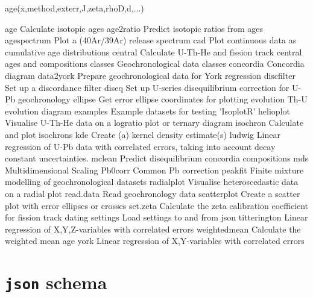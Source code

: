 \begin{refsection}
\begin{console}

age(x,method,exterr,J,zeta,rhoD,d,...)
            
\end{console}

age                     Calculate isotopic ages
age2ratio               Predict isotopic ratios from ages
agespectrum             Plot a (40Ar/39Ar) release spectrum
cad                     Plot continuous data as cumulative age
                        distributions
central                 Calculate U-Th-He and fission track central
                        ages and compositions
classes                 Geochronological data classes
concordia               Concordia diagram
data2york               Prepare geochronological data for York
                        regression
discfilter              Set up a discordance filter
diseq                   Set up U-series disequilibrium correction for
                        U-Pb geochronology
ellipse                 Get error ellipse coordinates for plotting
evolution               Th-U evolution diagram
examples                Example datasets for testing 'IsoplotR'
helioplot               Visualise U-Th-He data on a logratio plot or
                        ternary diagram
isochron                Calculate and plot isochrons
kde                     Create (a) kernel density estimate(s)
ludwig                  Linear regression of U-Pb data with correlated
                        errors, taking into account decay constant
                        uncertainties.
mclean                  Predict disequilibrium concordia compositions
mds                     Multidimensional Scaling
Pb0corr                 Common Pb correction
peakfit                 Finite mixture modelling of geochronological
                        datasets
radialplot              Visualise heteroscedastic data on a radial plot
read.data               Read geochronology data
scatterplot             Create a scatter plot with error ellipses or
                        crosses
set.zeta                Calculate the zeta calibration coefficient for
                        fission track dating
settings                Load settings to and from json
titterington            Linear regression of X,Y,Z-variables with
                        correlated errors
weightedmean            Calculate the weighted mean age
york                    Linear regression of X,Y-variables with
                        correlated errors


  \section{\texttt{json} schema}\label{sec:schema}

\printbibliography[heading=subbibliography]

\end{refsection}
